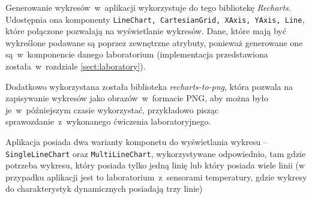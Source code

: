 Generowanie wykresów~w~aplikacji wykorzystuje do tego bibliotekę \textit{Recharts}. Udostępnia ona
komponenty \texttt{LineChart, CartesianGrid, XAxis, YAxis, Line}, które połączone pozwalają na
wyświetlanie wykresów. Dane, które mają być wykreślone podawane są poprzez zewnętrzne atrybuty,
ponieważ generowane one są~w~komponencie danego laboratorium (implementacja przedstawiona
została~w~rozdziale \ref{sect:laboratory}).

Dodatkowo wykorzystana została biblioteka \textit{recharts-to-png}, która pozwala na zapisywanie
wykresów jako obrazów~w~formacie PNG, aby można było je~w~późniejszym czasie wykorzystać,
przykładowo pisząc sprawozdanie~z~wykonanego ćwiczenia laboratoryjnego.

Aplikacja posiada dwa warianty komponetu do wyświetlania wykresu -- \texttt{SingleLineChart} oraz
\texttt{MultiLineChart}, wykorzystywane odpowiednio, tam gdzie potrzeba wykresu, który posiada tylko
jedną linię lub który posiada wiele linii (w przypadku aplikacji jest to laboratorium~z~sensorami
temperatury, gdzie wykresy do charakterystyk dynamicznych posiadają trzy linie)